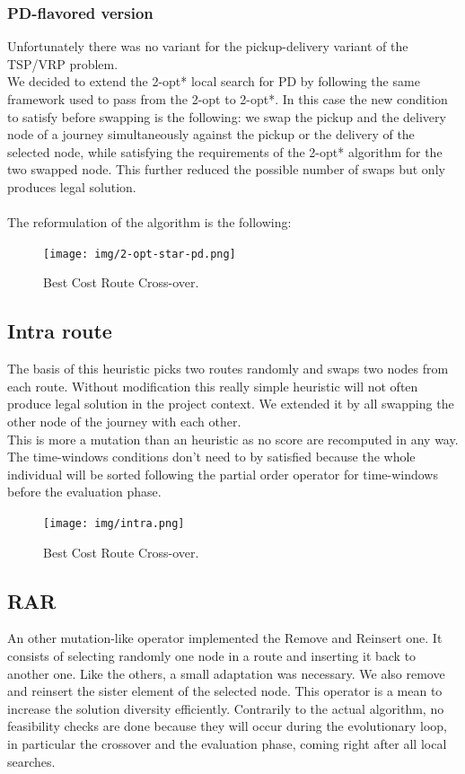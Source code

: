 \documentclass[12pt]{memoir}
\begin{document}
\subsubsection{PD-flavored version}
Unfortunately there was no variant for the pickup-delivery variant of the TSP/VRP problem.\\
We decided to extend the 2-opt* local search for PD by following the same framework used to
pass from the 2-opt to 2-opt*. In this case the new condition to satisfy before swapping is
the following: we swap the pickup and the delivery node of a journey simultaneously against the
pickup or the delivery of the selected node, while satisfying the requirements of the 2-opt*
algorithm for the two swapped node. This further reduced the possible number of swaps but only
produces legal solution.\\
\\
The reformulation of the algorithm is the following:
\\
\begin{figure}[htbp]
	\begin{center}
		\texttt{[image: img/2-opt-star-pd.png]}
		\caption{Best Cost Route Cross-over.}
	\end{center}
\end{figure}

\subsection{Intra route}
The basis of this heuristic picks two routes randomly and swaps two nodes from each route.
Without modification this really simple heuristic will not often produce legal solution in
the project context. We extended it by all swapping the other node of the journey with each other.\\
This is more a mutation than an heuristic as no score are recomputed in any way. The time-windows conditions
don't need to by satisfied because the whole individual will be sorted following the partial order operator
for time-windows before the evaluation phase.\\
\begin{figure}[htbp]
	\begin{center}
		\texttt{[image: img/intra.png]}
		\caption{Best Cost Route Cross-over.}
	\end{center}
\end{figure}

\subsection{RAR}
An other mutation-like operator implemented the Remove and Reinsert one. It consists of selecting randomly one node
in a route and inserting it back to another one. Like the others, a small adaptation was necessary.
We also remove and reinsert the sister element of the selected node. This operator is a mean
to increase the solution diversity efficiently. Contrarily to the actual algorithm, no feasibility checks are
done because they will occur during the evolutionary loop, in particular the crossover and
the evaluation phase, coming right after all local searches. \\
\end{document}
